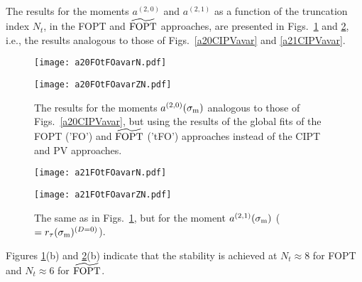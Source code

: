 \documentclass[aps,nofootinbib,showkeys,noshowpacs,preprintnumbers,amsmath,amssymb]{revtex4}
\newcommand{\sm}{{\sigma_{\rm m}}}
\begin{document}
The results for the moments $a^{(2,0)}$ and $a^{(2,1)}$ as a function of the truncation index $N_t$, in the  FOPT and ${\widetilde{\rm FOPT}}$ approaches, are presented in Figs.~\ref{a20FOtFOavar} and \ref{a21FOtFOavar}, i.e., the results analogous to those of Figs.~\ref{a20CIPVavar} and \ref{a21CIPVavar}.
\begin{figure}[htb] 
\begin{minipage}[b]{.49\linewidth}
  \centering\texttt{[image: a20FOtFOavarN.pdf]}
  \end{minipage}
\begin{minipage}[b]{.49\linewidth}
  \centering\texttt{[image: a20FOtFOavarZN.pdf]}
\end{minipage}
\vspace{-0.2cm}
\caption{\footnotesize  The results for the moments $a^{(2,0)}(\sm)$ analogous to those of Figs.~\ref{a20CIPVavar}, but using the results of the global fits of the FOPT ('FO') and  ${\widetilde{\rm FOPT}}$ ('tFO') approaches instead of the CIPT and PV approaches.}
\label{a20FOtFOavar}
\end{figure}
\begin{figure}[htb] 
\begin{minipage}[b]{.49\linewidth}
  \centering\texttt{[image: a21FOtFOavarN.pdf]}
  \end{minipage}
\begin{minipage}[b]{.49\linewidth}
  \centering\texttt{[image: a21FOtFOavarZN.pdf]}
\end{minipage}
\vspace{-0.2cm}
\caption{\footnotesize  The same as in Figs.~\ref{a20FOtFOavar}, but for the moment $a^{(2,1)}(\sm)$ ($= r_{\tau}(\sm)^{(D=0)}$).}
\label{a21FOtFOavar}
\end{figure}
Figures \ref{a20FOtFOavar}(b) and \ref{a21FOtFOavar}(b) indicate that the stability is achieved at $N_t \approx 8$ for FOPT and $N_t \approx 6$ for ${\widetilde{\rm FOPT}}$.
\end{document}
